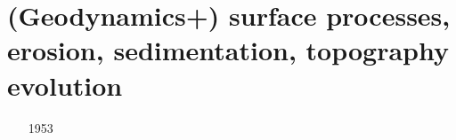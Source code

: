 \section{(Geodynamics+) surface processes, erosion, sedimentation, topography evolution}

\begin{scriptsize}
\begin{itemize}
\item [1953]                
\textcite{lema53} 
\item [\nineteensixty]      
\textcite{cull60} 
\item [\nineteenninety] 
\textcite{moen90} 
\textcite{enmo90} 
\item [\nineteenninetytwo] 
\textcite{befh92} 
\textcite{chas92} 
\item [\nineteenninetythree] 
\textcite{povp93} 
\textcite{wibf93} 
\item [\nineteenninetyfour] 
\textcite{howa94} 
\textcite{koon94} 
\textcite{kobe94} 
\textcite{gikb94} 
\textcite{whme04} 
\item [\nineteenninetyfive] 
\textcite{chmm95} 
\textcite{koon95} 
\item [\nineteenninetysix] 
\textcite{avbu96} 
\textcite{bekh96} 
\textcite{kobe96} 
\textcite{whme06} 
\item [\nineteenninetyseven] 
\textcite{brsa97} 
\textcite{gaft97} 
\textcite{babr97} 
\item [\nineteenninetyeight] 
\textcite{deea98} 
\textcite{vabr98} 
\item [\nineteenninetynine] 
\textcite{will99a} 
\textcite{bupi99} 
\textcite{babr99} 
\textcite{tobr99} 
\item [\twothousandone] 
\textcite{zemk01} 
\textcite{tulg01} 
\textcite{brsh01} 
\textcite{bupo01} 
\textcite{coul01} 
\textcite{crda01} 
\textcite{moln01} 
\item [\twothousandtwo] 
\textcite{wibr02} 
\textcite{mobr02} 
\textcite{garc02} 
\textcite{whtu02} 
\textcite{tuwh02} 
\item [\twothousandthree] 
\textcite{brau03} 
\item [\twothousandfour] 
\textcite{fijj04} 
\textcite{gocl04} 
\textcite{simp04} 
\textcite{skdi04} 

\end{itemize}
\end{scriptsize}
